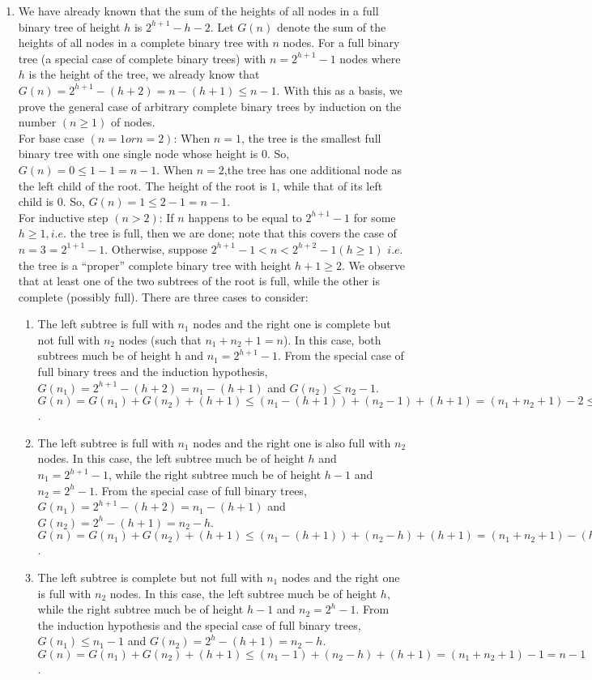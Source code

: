 \documentclass[a4paper,12pt]{article}
\begin{document}
\begin{enumerate}
{Since to count the summation of array needs $n$ steps to traverse all array, the time complexity is $\Omega (n)$.

}

\item{
We have already known that the sum of the heights of all nodes in a full binary tree of height $h$ is $2^{h+1} - h - 2$. Let $G(n)$ denote the sum of the heights of all nodes in a complete binary tree with $n$ nodes. For a full binary tree (a special case of complete binary trees) with $n = 2^{h+1} - 1$ nodes where $h$ is the height of the tree, we already know that $G(n) = 2^{h+1} -(h+2) = n-(h+1) \leq n-1$. With this as a basis, we prove the general case of arbitrary complete binary trees by induction on the number $(n \geq 1)$ of nodes. \\
For base case $(n = 1 or n = 2)$: When $n = 1$, the tree is the smallest full binary tree with one single node whose height is $0$. So,$G(n)=0\leq 1-1=n-1$. When $n=2$,the tree has one additional node as the left child of the root. The height of the root is $1$, while that of its left child is $0$. So, $G(n)=1 \leq 2 - 1=n - 1$. \\
For inductive step $(n > 2)$: If $n$ happens to be equal to $2^{h+1} − 1$ for some $h \geq 1, i.e.$ the tree is full, then we are done; note that this covers the case of $n = 3 = 2^{1+1} - 1$. Otherwise, suppose $2^{h+1} - 1 < n < 2^{h+2} - 1 (h \geq 1)$ $i.e.$ the tree is a “proper” complete binary tree with height $h + 1 \geq 2$. We observe that at least one of the two subtrees of the root is full, while the other is complete (possibly full). There are three cases to consider:
\begin{enumerate}
    \item {
The left subtree is full with $n_1$ nodes and the right one is complete but not full with $n_2$ nodes (such that $n_1 + n_2 + 1 = n$). In this case, both subtrees much be of height h and $n_1 = 2^{h+1} - 1$. From the special case of full binary trees and the induction hypothesis, $G(n_1) = 2^{h+1} - (h+2) = n_1 - (h+1)$ and $G(n_2) \leq n_2 - 1$. $G(n) = G(n_1)+G(n_2)+(h+1) \leq (n_1 - (h+1))+(n_2 - 1)+(h+1)=(n_1 +n_2 +1)-2\leq n -1$.
}
    \item {
The left subtree is full with $n_1$ nodes and the right one is also full with $n_2$ nodes. In this case, the left subtree much be of height $h$ and $n_1 = 2^{h+1} - 1$, while the right subtree much be of height $h - 1$ and $n_2 = 2^h - 1$. From the special case of full binary trees, $G(n_1) = 2^{h+1} - (h+2) = n_1 - (h+1)$ and $G(n_2) = 2^h - (h+1) = n_2 - h$. $G(n) = G(n_1)+G(n_2)+(h+1) \leq (n_1 -(h+1))+(n_2 -h)+(h+1) = (n_1 +n_2 +1)-(h+1) \leq n-1$.
}
    \item {
The left subtree is complete but not full with $n_1$ nodes and the right one is full with $n_2$ nodes. In this case, the left subtree much be of height $h$, while the right subtree much be of height $h - 1$ and $n_2 = 2^h - 1$. From the induction hypothesis and the special case of full binary trees, $G(n_1) \leq n_1 -1$ and $G(n_2) = 2^h -(h+1) = n_2 -h$. $G(n) = G(n_1)+G(n_2)+(h+1) \leq (n_1 -1)+(n_2 -h)+(h+1) = (n_1 +n_2 +1)-1 = n-1$.
}
\end{enumerate}

}
\end{enumerate}
\end{document}
